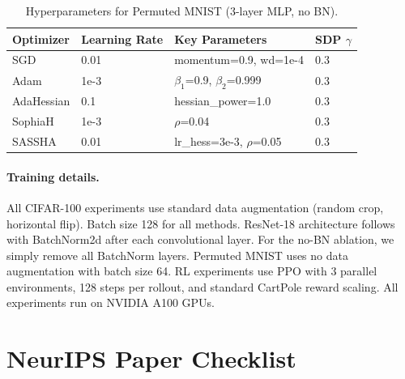 \documentclass{article}
\begin{document}
\begin{table}[h]
\caption{Hyperparameters for Permuted MNIST (3-layer MLP, no BN).}
\centering
\small
\begin{tabular}{@{}llll@{}}
\toprule
\textbf{Optimizer} & \textbf{Learning Rate} & \textbf{Key Parameters} & \textbf{SDP $\gamma$} \\
\midrule
SGD & 0.01 & momentum=0.9, wd=1e-4 & 0.3 \\
Adam & 1e-3 & $\beta_1$=0.9, $\beta_2$=0.999 & 0.3 \\
AdaHessian & 0.1 & hessian\_power=1.0 & 0.3 \\
SophiaH & 1e-3 & $\rho$=0.04 & 0.3 \\
SASSHA & 0.01 & lr\_hess=3e-3, $\rho$=0.05 & 0.3 \\
\bottomrule
\end{tabular}
\end{table}

\paragraph{Training details.}
All CIFAR-100 experiments use standard data augmentation (random crop, horizontal flip). Batch size 128 for all methods. ResNet-18 architecture follows~\citet{he2016deep} with BatchNorm2d after each convolutional layer. For the no-BN ablation, we simply remove all BatchNorm layers. Permuted MNIST uses no data augmentation with batch size 64. RL experiments use PPO with 3 parallel environments, 128 steps per rollout, and standard CartPole reward scaling. All experiments run on NVIDIA A100 GPUs.


\newpage
\section*{NeurIPS Paper Checklist}
\end{document}
